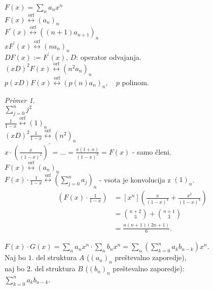 \documentclass[a4paper, 12pt]{book}
\theoremstyle{definition}
\theoremstyle{remark}
\newtheorem*{ex}{Primer}
\begin{document}
$F(x) = \sum_n a_n x^n$ \\
$F(x) \stackrel{\text{orf}}{\longleftrightarrow} (a_n)_n$ \\
$F^{'}(x) \stackrel{\text{orf}}{\longleftrightarrow} ((n+1) a_{n+1})_n$ \\
$x F^{'}(x) \stackrel{\text{orf}}{\longleftrightarrow} (n a_n)_n$ \\
$D F(x) := F^{'}(x)$, $D$: operator odvajanja. \\
$(x D)^2 F(x) \stackrel{\text{orf}}{\longleftrightarrow} (n^2 a_n)_n$ \\
$p(x D) F(x) \stackrel{\text{orf}}{\longleftrightarrow} (p(n) a_n)_n, \quad p$ polinom.
\begin{ex} \text{} \\
  $\sum_{j=0}^n j^2$ \\
  $\frac{1}{1-x} \stackrel{\text{orf}}{\longleftrightarrow} (1)_n$ \\
  $(x D)^2 \frac{1}{1-x} \stackrel{\text{orf}}{\longleftrightarrow} \left( n^2 \right)_n$ \\
  $x \cdot \left(\frac{x}{(1-x)^2}\right)^{'} = \dots = \frac{x(1+x)}{(1-x)^3} = F(x)$ - samo členi. \\
  $F(x) \stackrel{\text{orf}}{\longleftrightarrow} (a_n)_n$ \\
  $F(x) \cdot \frac{1}{1-x} \stackrel{\text{orf}}{\longleftrightarrow} \left(\sum_{j=0}^{n} a_j\right)_n$
    - vsota je konvolucija z $(1)_n$. \\
  \begin{align*}
    [x^n] \left(F(x) \cdot \frac{1}{1-x}\right) &= [x^n] \left(\frac{x}{(1-x)^4} + \frac{x^2}{(1-x)^4}\right) \\
    &= \binom{n+2}{3} + \binom{n+1}{3} \\
    &= \frac{n(n+1)(2n+1)}{6}.
  \end{align*}
\end{ex}
$F(x) \cdot G(x) = \sum_n a_n x^n \cdot \sum_n b_n x^n = \sum_n \left(\sum_{k=0}^{n} a_k b_{n-k}\right) x^n$. \\
Naj bo $1.$ del struktura $A$ ($(a_n)_n$ preštevalno zaporedje), \\
naj bo $2.$ del struktura $B$ ($(b_n)_n$ preštevalno zaporedje): \\
$\sum_{k=0}^n a_k b_{n-k}$.
\end{document}

